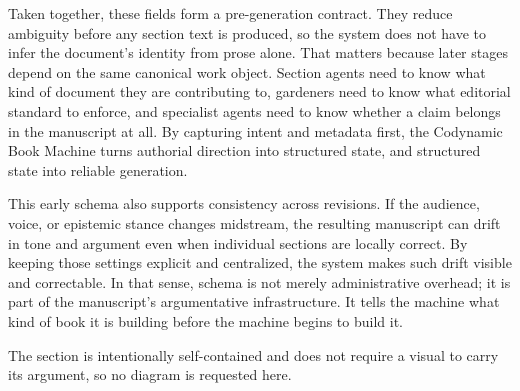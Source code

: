Taken together, these fields form a pre-generation contract. They reduce ambiguity before any section text is produced, so the system does not have to infer the document's identity from prose alone. That matters because later stages depend on the same canonical work object. Section agents need to know what kind of document they are contributing to, gardeners need to know what editorial standard to enforce, and specialist agents need to know whether a claim belongs in the manuscript at all. By capturing intent and metadata first, the Codynamic Book Machine turns authorial direction into structured state, and structured state into reliable generation.

This early schema also supports consistency across revisions. If the audience, voice, or epistemic stance changes midstream, the resulting manuscript can drift in tone and argument even when individual sections are locally correct. By keeping those settings explicit and centralized, the system makes such drift visible and correctable. In that sense, schema is not merely administrative overhead; it is part of the manuscript's argumentative infrastructure. It tells the machine what kind of book it is building before the machine begins to build it.

The section is intentionally self-contained and does not require a visual to carry its argument, so no diagram is requested here.
